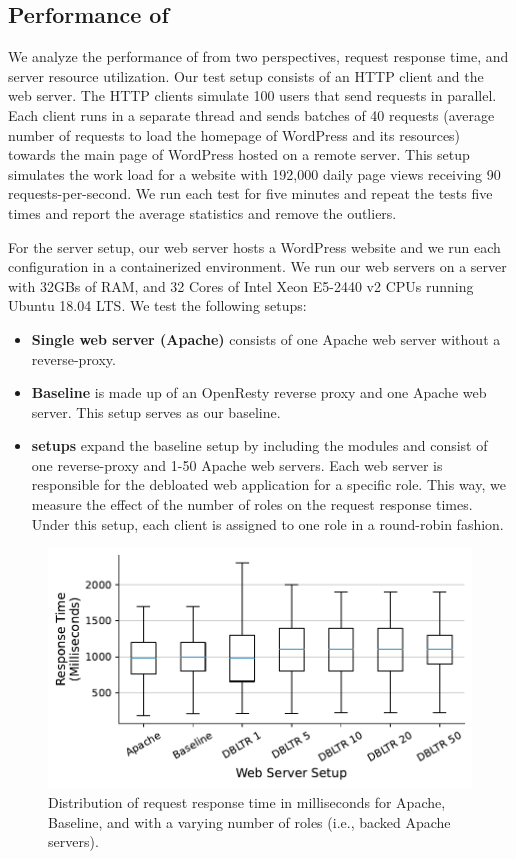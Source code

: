 \subsection{Performance of \dbltr{}}

We analyze the performance of \dbltr{} from two perspectives, request response time, and server resource utilization. 
Our test setup consists of an HTTP client and the web server. 
The HTTP clients simulate 100 users that send requests in parallel. 
Each client runs in a separate thread and sends batches of 40 requests (average number of requests to load the homepage of WordPress and its resources) towards the main page of WordPress hosted on a remote server. 
This setup simulates the work load for a website with 192,000 daily page views receiving 90 requests-per-second. 
We run each test for five minutes and repeat the tests five times and report the average statistics and remove the outliers. 

For the server setup, our web server hosts a WordPress website and we run each configuration in a containerized environment. 
We run our web servers on a server with 32GBs of RAM, and 32 Cores of Intel Xeon E5-2440 v2 CPUs running Ubuntu 18.04 LTS. 
We test the following setups:

\begin{itemize}
    \item \textbf{Single web server (Apache)} consists of one Apache web server without a reverse-proxy. 
    \item \textbf{Baseline} is made up of an OpenResty reverse proxy and one Apache web server. This setup serves as our baseline. 
    \item \textbf{\dbltr{} setups} expand the baseline setup by including the \dbltr{} modules and consist of one reverse-proxy and 1-50 Apache web servers. Each web server is responsible for the debloated web application for a specific role. This way, we measure the effect of the number of roles on the request response times. Under this setup, each client is assigned to one role in a round-robin fashion.
\end{itemize}

\begin{figure}[]
    \centering
    \includegraphics[width=\linewidth]{figures/dbltr/performance.pdf}
    \caption{Distribution of request response time in milliseconds for Apache, Baseline, and \dbltr{} with a varying number of roles (i.e., backed Apache servers).}
    \label{fig:performance}
  \end{figure}

